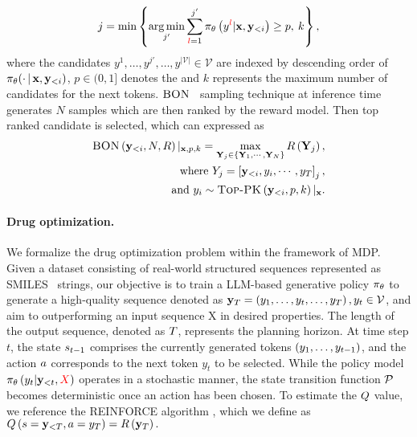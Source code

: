 {\begin{gather}
     j= \min \left\{\mathop{\rm arg\,min}_{j'}\sum_{{\color{red} l}=1}^{j'}\pi_{\theta} \left( {y^{{\color{red} l}}|\mathbf{x},\mathbf{y}_{<i}} \right)  \geq p, \: k\right\},  \notag
\end{gather}
where the candidates $y^1, \dots, y^{j'}, \dots, y^{|\mathcal{V}|} \in \mathcal{V}$ are indexed by descending order of $\pi_\theta(\cdot {\,|\,} \mathbf{x},\mathbf{y}_{<i})$, $p\in (0,1]$ denotes the 
and $k$ represents the maximum number of candidates for the next tokens.
$\textsc{BON}$~\citep{gao2023scaling} sampling technique at inference time generates $N$ samples which are then ranked by the reward model. Then top ranked candidate is selected, which can expressed as 
\begin{align}
{\textsc{BON}} \left( {\mathbf{y}_{<i},N,R} \right) |_{\textbf{x},p,k}= \max_{\mathbf{Y}_{j}\in \left\{\mathbf{Y}_1,\cdots,\mathbf{Y}_{N}\right\}} R \left( { \mathbf{Y}_{j}} \right) ,\\
\text{where } Y_j=\left[\mathbf{y}_{<i},y_i,\cdots,y_{T}\right]_j,\\ \text{and } y_i \sim \textsc{Top-PK} \left( {\mathbf{y}_{<i},p, k} \right) |_{\mathbf{x}}.
\end{align}\label{eq:bestN}
}
\paragraph{Drug {optimization}.} 
We formalize the drug {optimization} problem within the framework of MDP. Given a dataset consisting of real-world structured sequences represented as SMILES~\citep{weininger1988smiles} strings, 
our objective is to train a {LLM-based} generative policy $\pi_{{\theta}}$ to generate a high-quality sequence denoted as $\mathbf{y}_{T}= \left( {y_1,\ldots,y_t,\ldots,y_{T}} \right) ,y_t\in \mathcal{V}$, {and aim to outperforming an input sequence X in desired properties}.
The length of the output sequence, denoted as $T$, represents the planning horizon. At time step $t$, the state $s_{t-1}$ comprises the currently generated tokens $ \left( {y_1,\ldots,y_{t-1}} \right) $, and the action $a$ corresponds to the next token $y_t$ to be selected. While the policy model $\pi_{{\theta}} \left( {y_t|\mathbf{y}_{<t}, {\color{red} X}} \right) $ operates in a stochastic manner, the state transition function $\mathcal{P}$ becomes deterministic once an action has been chosen. 
To estimate the $Q$ value, we reference the REINFORCE algorithm \citep{williams1992simple}, which we define as 
$Q \left( {s= 
\mathbf{y}_{<T},a=y_{T}} \right) =R \left( {\mathbf{y}_{T}} \right) . $



